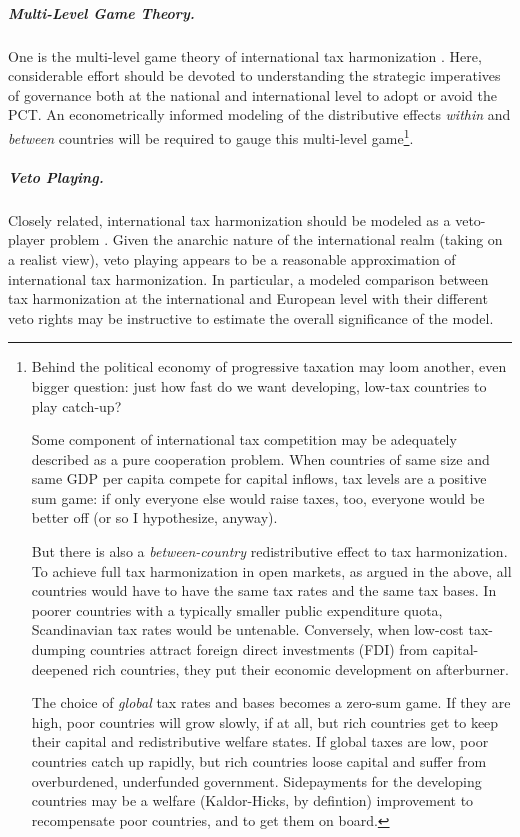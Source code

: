 \subparagraph{Multi-Level Game Theory.} One is the multi-level game theory of international tax harmonization \citep{Scharpf-1997-aa}.
Here, considerable effort should be devoted to understanding the strategic imperatives of governance both at the national and international level to adopt or avoid the PCT.
An econometrically informed modeling of the distributive effects \emph{within} and \emph{between} countries will be required to gauge this multi-level game\footnote{Behind the political economy of progressive taxation may loom another, even bigger question:
just how fast do we want developing, low-tax countries to play catch-up?

Some component of international tax competition may be adequately described as a pure cooperation problem.
When countries of same size and same GDP per capita compete for capital inflows, tax levels are a positive sum game:
if only everyone else would raise taxes, too, everyone would be better off (or so I hypothesize, anyway).

But there is also a \emph{between-country} redistributive effect to tax harmonization.
To achieve full tax harmonization in open markets, as argued in the above, all countries would have to have the same tax rates and the same tax bases.
In poorer countries with a typically smaller public expenditure quota, Scandinavian tax rates would be untenable.
Conversely, when low-cost tax-dumping countries attract foreign direct investments (FDI) from capital-deepened rich countries, they put their economic development on afterburner.

The choice of \emph{global} tax rates and bases becomes a zero-sum game.
If they are high, poor countries will grow slowly, if at all, but rich countries get to keep their capital and redistributive welfare states.
If global taxes are low, poor countries catch up rapidly, but rich countries loose capital and suffer from overburdened, underfunded government.
Sidepayments for the developing countries may be a welfare (Kaldor-Hicks, by defintion) improvement to recompensate poor countries, and to get them on board.}.

\subparagraph{Veto Playing.} Closely related, international tax harmonization should be modeled as a veto-player problem \citep{Tsebelis-2002-aa}.
Given the anarchic nature of the international realm (taking on a realist view), veto playing appears to be a reasonable approximation of international tax harmonization.
In particular, a modeled comparison between tax harmonization at the international and European level with their different veto rights may be instructive to estimate the overall significance of the model.

